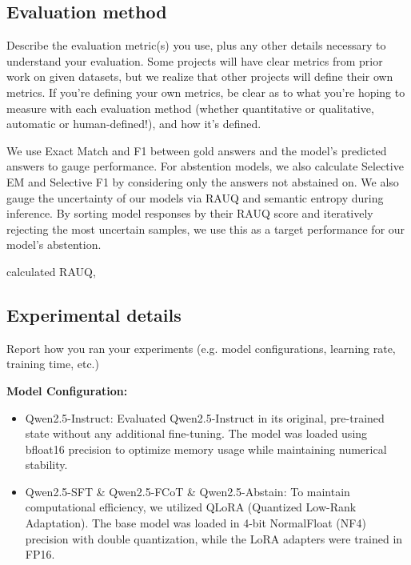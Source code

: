 \documentclass{article}
\begin{document}
\subsection{Evaluation method}
Describe the evaluation metric(s) you use, plus any other details necessary to understand your evaluation.
Some projects will have clear metrics from prior work on given datasets, but we realize that other projects will define their own metrics.
If you're defining your own metrics, be clear as to what you're hoping to measure with each evaluation method (whether quantitative or qualitative, automatic or human-defined!), and how it's defined.

We use Exact Match and F1 between gold answers and the model's predicted answers to gauge performance. For abstention models, we also calculate Selective EM and Selective F1 by considering only the answers not abstained on. We also gauge the uncertainty of our models via RAUQ and semantic entropy during inference. By sorting model responses by their RAUQ score \cite{vazhentsev2025rauq} and iteratively rejecting the most uncertain samples, we use this as a target performance for our model's abstention.

calculated RAUQ, 

\subsection{Experimental details}
Report how you ran your experiments (e.g. model configurations, learning rate, training time, etc.)

\textbf{Model Configuration:} 
\begin{itemize}
    \item Qwen2.5-Instruct: Evaluated Qwen2.5-Instruct in its original, pre-trained state without any additional fine-tuning. The model was loaded using bfloat16 precision to optimize memory usage while maintaining numerical stability.
    \item Qwen2.5-SFT \& Qwen2.5-FCoT \& Qwen2.5-Abstain: To maintain computational efficiency, we utilized QLoRA (Quantized Low-Rank Adaptation). The base model was loaded in 4-bit NormalFloat (NF4) precision with double quantization, while the LoRA adapters were trained in FP16.
\end{itemize}
\end{document}
